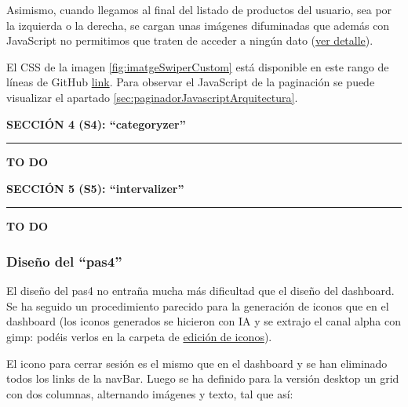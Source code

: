 \documentclass[a4paper,12pt]{report}
\begin{document}
	Asimismo, cuando llegamos al final del listado de productos del usuario, sea por la izquierda o la derecha, se cargan unas imágenes difuminadas que además con JavaScript no permitimos que traten de acceder a ningún dato (\href{https://github.com/blackcub3s/mercApp/blob/main/APP%20WEB/__frontend__produccio__/app/img/dashboard/paginadorEsqDifuminat.png}{ver detalle}).
	
	El CSS de la imagen \ref{fig:imatgeSwiperCustom} está disponible en este rango de líneas de GitHub \href{https://github.com/blackcub3s/mercApp/blob/4ddc34194763af7a246ffabb14146ad9b4b2c5db/APP%20WEB/__frontend__produccio__/app/css/dashboard/estils.css#L155}{link}. Para observar el JavaScript de la paginación se puede visualizar el apartado \ref{sec:paginadorJavascriptArquitectura}.
	
	
	
	
	\noindent \textbf{SECCIÓN 4 (S4): ``categoryzer''}
	\hrule
	\vspace{.5em}
	
	\textbf{TO DO}
	
	
	\noindent \textbf{SECCIÓN 5 (S5): ``intervalizer''}
	\hrule
	\vspace{.5em}
	
	\textbf{TO DO}
	
	\subsubsection{Diseño del ``pas4''}
	
	El diseño del pas4 no entraña mucha más dificultad que el diseño del dashboard. Se ha seguido un procedimiento parecido para la generación de iconos que en el dashboard (los iconos generados se hicieron con IA y se extrajo el canal alpha con gimp: podéis verlos en la carpeta de \href{https://github.com/blackcub3s/mercApp/tree/main/creacioIconos/iconosPas4}{edición de iconos}).
	
	El icono para cerrar sesión es el mismo que en el dashboard y se han eliminado todos los links de la navBar. Luego se ha definido para la versión desktop un grid con dos columnas, alternando imágenes y texto, tal que así:
	
\end{document}
